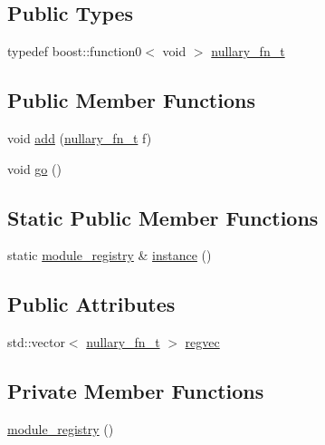 \subsection*{Public Types}
\begin{DoxyCompactItemize}
\item 
typedef boost\+::function0$<$ void $>$ \hyperlink{structecto_1_1registry_1_1module__registry_a90fc28cbb13d6662b0b8d898985be04e}{nullary\+\_\+fn\+\_\+t}
\end{DoxyCompactItemize}
\subsection*{Public Member Functions}
\begin{DoxyCompactItemize}
\item 
void \hyperlink{structecto_1_1registry_1_1module__registry_aef2549c7e8d6840420041f2231dcdebf}{add} (\hyperlink{structecto_1_1registry_1_1module__registry_a90fc28cbb13d6662b0b8d898985be04e}{nullary\+\_\+fn\+\_\+t} f)
\item 
void \hyperlink{structecto_1_1registry_1_1module__registry_ab8a2255326e085adc04ad180aa1752ec}{go} ()
\end{DoxyCompactItemize}
\subsection*{Static Public Member Functions}
\begin{DoxyCompactItemize}
\item 
static \hyperlink{structecto_1_1registry_1_1module__registry}{module\+\_\+registry} \& \hyperlink{structecto_1_1registry_1_1module__registry_ac968548cf0e11339bf002828e67b857f}{instance} ()
\end{DoxyCompactItemize}
\subsection*{Public Attributes}
\begin{DoxyCompactItemize}
\item 
std\+::vector$<$ \hyperlink{structecto_1_1registry_1_1module__registry_a90fc28cbb13d6662b0b8d898985be04e}{nullary\+\_\+fn\+\_\+t} $>$ \hyperlink{structecto_1_1registry_1_1module__registry_a77ae3e886433428c82d5dbb8039d53f6}{regvec}
\end{DoxyCompactItemize}
\subsection*{Private Member Functions}
\begin{DoxyCompactItemize}
\item 
\hyperlink{structecto_1_1registry_1_1module__registry_aef45ef0e61d967ea203db086f8aa9f65}{module\+\_\+registry} ()
\end{DoxyCompactItemize}


